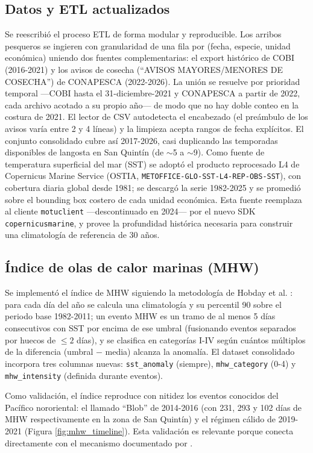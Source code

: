 \documentclass[twoside,11pt]{article}
\begin{document}
\subsection{Datos y ETL actualizados}
Se reescribió el proceso ETL de forma modular y reproducible. Los arribos pesqueros se ingieren con granularidad de una fila por (fecha, especie, unidad económica) uniendo dos fuentes complementarias: el export histórico de COBI (2016-2021) y los avisos de cosecha (``AVISOS MAYORES/MENORES DE COSECHA'') de CONAPESCA (2022-2026). La unión se resuelve por prioridad temporal ---COBI hasta el 31-diciembre-2021 y CONAPESCA a partir de 2022, cada archivo acotado a su propio año--- de modo que no hay doble conteo en la costura de 2021. El lector de CSV autodetecta el encabezado (el preámbulo de los avisos varía entre 2 y 4 líneas) y la limpieza acepta rangos de fecha explícitos. El conjunto consolidado cubre así 2017-2026, casi duplicando las temporadas disponibles de langosta en San Quintín (de $\sim$5 a $\sim$9). Como fuente de temperatura superficial del mar (SST) se adoptó el producto reprocesado L4 de Copernicus Marine Service (OSTIA, \texttt{METOFFICE-GLO-SST-L4-REP-OBS-SST}), con cobertura diaria global desde 1981; se descargó la serie 1982-2025 y se promedió sobre el bounding box costero de cada unidad económica. Esta fuente reemplaza al cliente \texttt{motuclient} —descontinuado en 2024— por el nuevo SDK \texttt{copernicusmarine}, y provee la profundidad histórica necesaria para construir una climatología de referencia de 30 años.

\subsection{Índice de olas de calor marinas (MHW)}
Se implementó el índice de MHW siguiendo la metodología de Hobday et al. \cite{hobday2016}: para cada día del año se calcula una climatología y su percentil 90 sobre el periodo base 1982-2011; un evento MHW es un tramo de al menos 5 días consecutivos con SST por encima de ese umbral (fusionando eventos separados por huecos de $\leq 2$ días), y se clasifica en categorías I-IV según cuántos múltiplos de la diferencia (umbral $-$ media) alcanza la anomalía. El dataset consolidado incorpora tres columnas nuevas: \texttt{sst\_anomaly} (siempre), \texttt{mhw\_category} (0-4) y \texttt{mhw\_intensity} (definida durante eventos).

Como validación, el índice reproduce con nitidez los eventos conocidos del Pacífico nororiental: el llamado ``Blob'' de 2014-2016 (con 231, 293 y 102 días de MHW respectivamente en la zona de San Quintín) y el régimen cálido de 2019-2021 (Figura \ref{fig:mhw_timeline}). Esta validación es relevante porque conecta directamente con el mecanismo documentado por \cite{villasenor2024}.
\end{document}
